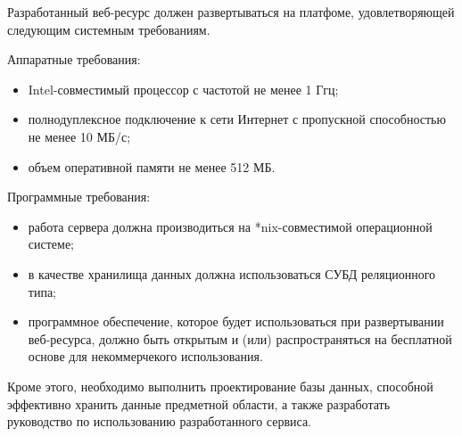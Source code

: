 Разработанный веб-ресурс должен развертываться на платфоме,
удовлетворяющей следующим системным требованиям.

Аппаратные требования:
\begin{itemize}
\item Intel-совместимый процессор с частотой не менее 1 Ггц;
\item полнодуплексное подключение к сети Интернет с
  пропускной способностью не менее 10 МБ/с;
\item объем оперативной памяти не менее 512 МБ.
\end{itemize}

Программные требования:
\begin{itemize}
\item работа сервера должна производиться на *nix-совместимой 
  операционной системе;
\item в качестве хранилища данных должна использоваться 
  СУБД реляционного типа;
\item программное обеспечение, которое будет использоваться при 
  развертывании веб-ресурса, должно быть открытым и (или) распространяться 
  на бесплатной основе для некоммерчекого использования. 
\end{itemize}

Кроме этого, необходимо выполнить проектирование базы данных, 
способной эффективно хранить данные предметной области, а также
разработать руководство по использованию разработанного сервиса.
